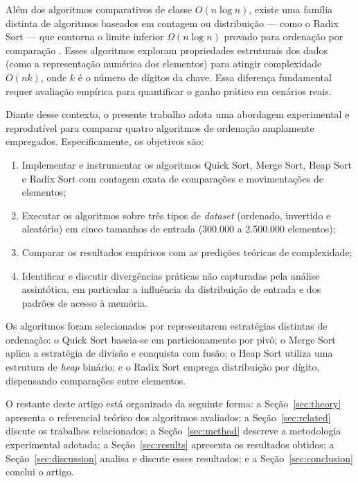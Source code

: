 \documentclass[12pt]{article}
\begin{document}
Além dos algoritmos comparativos de classe $O(n \log n)$, existe uma
família distinta de algoritmos baseados em contagem ou distribuição —
como o Radix Sort — que contorna o limite inferior $\Omega(n \log n)$
provado para ordenação por comparação \cite{cormen2009}. Esses algoritmos
exploram propriedades estruturais dos dados (como a representação numérica
dos elementos) para atingir complexidade $O(nk)$, onde $k$ é o número
de dígitos da chave. Essa diferença fundamental requer avaliação empírica
para quantificar o ganho prático em cenários reais.

Diante desse contexto, o presente trabalho adota uma abordagem
experimental e reprodutível para comparar quatro algoritmos de
ordenação amplamente empregados. Especificamente, os objetivos são:

\begin{enumerate}
  \item Implementar e instrumentar os algoritmos Quick Sort, Merge Sort,
        Heap Sort e Radix Sort com contagem exata de comparações e
        movimentações de elementos;
  \item Executar os algoritmos sobre três tipos de \textit{dataset}
        (ordenado, invertido e aleatório) em cinco tamanhos de entrada
        (300.000 a 2.500.000 elementos);
  \item Comparar os resultados empíricos com as predições teóricas
        de complexidade;
  \item Identificar e discutir divergências práticas não capturadas
        pela análise assintótica, em particular a influência da
        distribuição de entrada e dos padrões de acesso à memória.
\end{enumerate}

Os algoritmos foram selecionados por representarem estratégias
distintas de ordenação: o Quick Sort baseia-se em particionamento
por pivô; o Merge Sort aplica a estratégia de divisão e conquista
com fusão; o Heap Sort utiliza uma estrutura de \textit{heap} binário;
e o Radix Sort emprega distribuição por dígito, dispensando
comparações entre elementos.

O restante deste artigo está organizado da seguinte forma:
a Seção~\ref{sec:theory} apresenta o referencial teórico dos
algoritmos avaliados; a Seção~\ref{sec:related} discute os
trabalhos relacionados; a Seção~\ref{sec:method} descreve a
metodologia experimental adotada; a Seção~\ref{sec:results}
apresenta os resultados obtidos; a Seção~\ref{sec:discussion}
analisa e discute esses resultados; e a Seção~\ref{sec:conclusion}
conclui o artigo.
\end{document}
